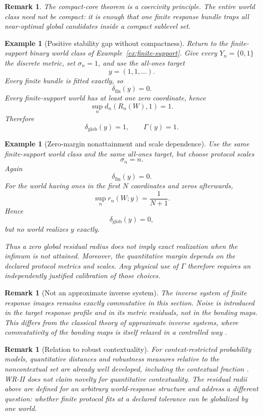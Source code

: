 \documentclass[11pt]{article}
\newtheorem{example}[definition]{Example}
\newtheorem{remark}[definition]{Remark}
\begin{document}
\begin{remark}
The compact-core theorem is a coercivity principle. The entire world class
need not be compact: it is enough that one finite response bundle traps all
near-optimal global candidates inside a compact sublevel set.
\end{remark}

\begin{example}[Positive stability gap without compactness]
Return to the finite-support binary world class of
Example~\ref{ex:finite-support}. Give every $Y_n=\{0,1\}$ the discrete metric,
set $\sigma_n=1$, and use the all-ones target
\[
y=(1,1,\ldots).
\]
Every finite bundle is fitted exactly, so
\[
\delta_{\mathrm{fin}}(y)=0.
\]
Every finite-support world has at least one zero coordinate, hence
\[
\sup_n d_n(R_n(W),1)=1.
\]
Therefore
\[
\delta_{\mathrm{glob}}(y)=1,
\qquad
\Gamma(y)=1.
\]
\end{example}

\begin{example}[Zero-margin nonattainment and scale dependence]
Use the same finite-support world class and the same all-ones target, but choose
protocol scales
\[
\sigma_n=n.
\]
Again
\[
\delta_{\mathrm{fin}}(y)=0.
\]
For the world having ones in the first $N$ coordinates and zeros afterwards,
\[
\sup_n r_n(W;y)
=
\frac{1}{N+1}.
\]
Hence
\[
\delta_{\mathrm{glob}}(y)=0,
\]
but no world realizes $y$ exactly.

Thus a zero global residual radius does not imply exact realization when the
infimum is not attained. Moreover, the quantitative margin depends on the
declared protocol metrics and scales. Any physical use of $\Gamma$ therefore
requires an independently justified calibration of those choices.
\end{example}

\begin{remark}[Not an approximate inverse system]
The inverse system of finite response images remains exactly commutative in
this section. Noise is introduced in the target response profile and in its
metric residuals, not in the bonding maps. This differs from the classical
theory of approximate inverse systems, where commutativity of the bonding
maps is itself relaxed in a controlled way
\cite{MardesicRubin1989,MardesicSegal1989}.
\end{remark}

\begin{remark}[Relation to robust contextuality]
For context-restricted probability models, quantitative distances and
robustness measures relative to the noncontextual set are already well
developed, including the contextual fraction
\cite{AbramskyBarbosaMansfield2017}. WR-II does not claim novelty for
quantitative contextuality. The residual radii above are defined for an
arbitrary world-response structure and address a different question: whether
finite protocol fits at a declared tolerance can be globalized by one world.
\end{remark}
\end{document}
